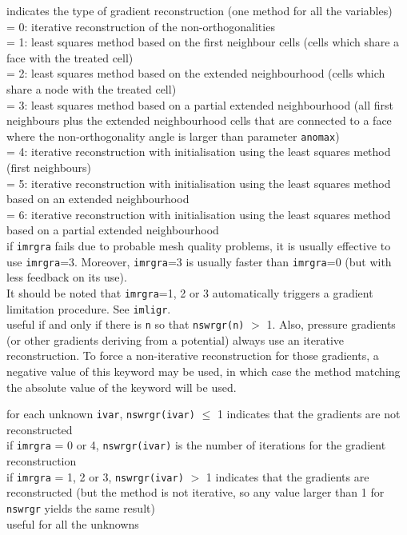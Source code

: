 {indicates the type of gradient reconstruction (one method for all the
variables)\\
\hspace*{1.3cm}= 0: iterative reconstruction of the non-orthogonalities\\
\hspace*{1.3cm}= 1: least squares method based on the first neighbour cells
(cells which share a face with the treated cell)\\
\hspace*{1.3cm}= 2: least squares method based on the extended neighbourhood
(cells which share a node with the treated cell)\\
\hspace*{1.3cm}= 3: least squares method based on a partial extended
neighbourhood (all first neighbours plus the extended neighbourhood cells that
are connected to a face where the non-orthogonality angle is larger than
parameter {\tt anomax})\\
\hspace*{1.3cm}= 4: iterative reconstruction with initialisation using the least
squares method (first neighbours)\\
\hspace*{1.3cm}= 5: iterative reconstruction with initialisation using the least
squares method based on an extended neighbourhood\\
\hspace*{1.3cm}= 6: iterative reconstruction with initialisation using the least
squares method based on a partial extended neighbourhood\\
if {\tt imrgra} fails due to probable mesh quality problems, it is usually effective
to use {\tt imrgra}=3. Moreover, {\tt imrgra}=3 is usually faster than
{\tt imrgra}=0 (but with less feedback on its use).\\
It should be noted that {\tt imrgra}=1, 2 or 3 automatically triggers a gradient
limitation procedure. See {\tt imligr}.\\
useful if and only if there is {\tt n} so that {\tt nswrgr(n)} $>$ 1.
Also, pressure gradients (or other gradients deriving from a potential)
always use an iterative reconstruction. To force a non-iterative
reconstruction for those gradients, a negative value of this keyword may be
used, in which case the method matching the absolute value of the keyword will
be used.}

{for each unknown {\tt ivar}, {\tt nswrgr(ivar)} $\leqslant$ 1 indicates that the
gradients are not reconstructed\\
\hspace*{1.3cm}if {\tt imrgra} = 0 or 4, {\tt nswrgr(ivar)} is the number of
iterations for the gradient reconstruction\\
\hspace*{1.3cm}if {\tt imrgra} = 1, 2 or 3, {\tt nswrgr(ivar)} $>$ 1 indicates that
the gradients are reconstructed (but the method is not iterative, so any value
larger than 1 for {\tt nswrgr} yields the same result)\\
useful for all the unknowns}

